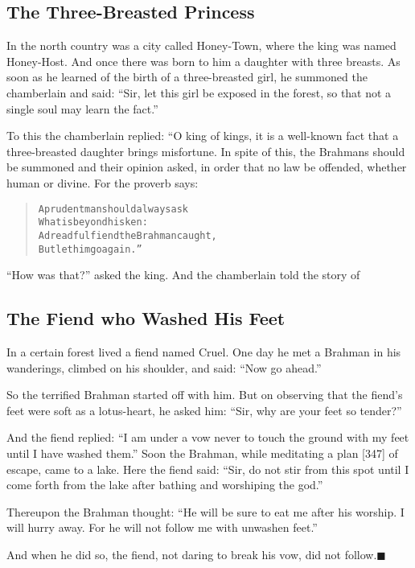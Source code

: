 \documentclass[article, twoside, 14pt]{memoir}
\newcommand{\qed}{\hfill \ensuremath{\blacksquare}}
\renewenvironment{verbatim}{%
\begin{quote}%
\vskip -10pt%
\begin{alltt}\normalfont\large}{\end{alltt}%
\end{quote}%
\vskip -10pt
} %
\begin{document}
\subsection{The Three-Breasted Princess}

\label{s89}

In the north country was a city called Honey-Town, where the king
was named Honey-Host. And once there was born to him a daughter
with three breasts. As soon as he learned of the birth of a
three-breasted girl, he summoned the chamberlain and said:
``Sir, let this girl be exposed in the forest, so that not a single soul may learn the fact.''

To this the chamberlain replied: “O king of kings, it is a
well-known fact that a three-breasted daughter brings misfortune.
In spite of this, the Brahmans should be summoned and their opinion
asked, in order that no law be offended, whether human or divine.
For the proverb says:

\begin{verbatim}
A prudent man should always ask
    What is beyond his ken:
A dreadful fiend the Brahman caught,
    But let him go again.”
\end{verbatim}
``How was that?'' asked the king. And the chamberlain told the
story of

\subsection{The Fiend who Washed His Feet}

\label{s90}

In a certain forest lived a fiend named Cruel. One day he met a
Brahman in his wanderings, climbed on his shoulder, and said:
``Now go ahead.''

So the terrified Brahman started off with him. But on observing
that the fiend's feet were soft as a lotus-heart, he asked him:
``Sir, why are your feet so tender?''

And the fiend replied:
``I am under a vow never to touch the ground with my feet until I have washed them.''
Soon the Brahman, while meditating a plan [347] of escape, came to
a lake. Here the fiend said:
``Sir, do not stir from this spot until I come forth from the lake after bathing and worshiping the god.''

Thereupon the Brahman thought:
``He will be sure to eat me after his worship. I will hurry away. For he will not follow me with unwashen feet.''

And when he did so, the fiend, not daring to break his vow, did not
follow.\hyperref[s90]{\qed}
\end{document}
